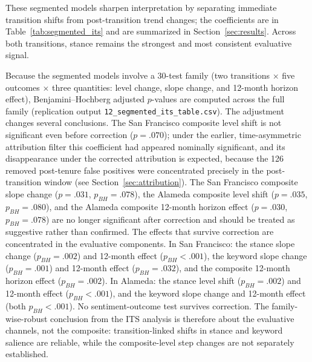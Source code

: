 \documentclass[12pt, letterpaper]{article}
\begin{document}
\begin{appendices}
These segmented models sharpen interpretation by separating immediate transition shifts from post-transition trend changes; the coefficients are in Table~\ref{tab:segmented_its} and are summarized in Section~\ref{sec:results}. Across both transitions, stance remains the strongest and most consistent evaluative signal.

Because the segmented models involve a 30-test family (two transitions $\times$ five outcomes $\times$ three quantities: level change, slope change, and 12-month horizon effect), Benjamini--Hochberg adjusted $p$-values are computed across the full family (replication output \texttt{12\_segmented\_its\_table.csv}). The adjustment changes several conclusions. The San Francisco composite level shift is not significant even before correction ($p = .070$); under the earlier, time-asymmetric attribution filter this coefficient had appeared nominally significant, and its disappearance under the corrected attribution is expected, because the 126 removed post-tenure false positives were concentrated precisely in the post-transition window (see Section~\ref{sec:attribution}). The San Francisco composite slope change ($p = .031$, $p_{BH} = .078$), the Alameda composite level shift ($p = .035$, $p_{BH} = .080$), and the Alameda composite 12-month horizon effect ($p = .030$, $p_{BH} = .078$) are no longer significant after correction and should be treated as suggestive rather than confirmed. The effects that survive correction are concentrated in the evaluative components. In San Francisco: the stance slope change ($p_{BH} = .002$) and 12-month effect ($p_{BH} < .001$), the keyword slope change ($p_{BH} = .001$) and 12-month effect ($p_{BH} = .032$), and the composite 12-month horizon effect ($p_{BH} = .002$). In Alameda: the stance level shift ($p_{BH} = .002$) and 12-month effect ($p_{BH} < .001$), and the keyword slope change and 12-month effect (both $p_{BH} < .001$). No sentiment-outcome test survives correction. The family-wise-robust conclusion from the ITS analysis is therefore about the evaluative channels, not the composite: transition-linked shifts in stance and keyword salience are reliable, while the composite-level step changes are not separately established.


\end{appendices}
\end{document}
